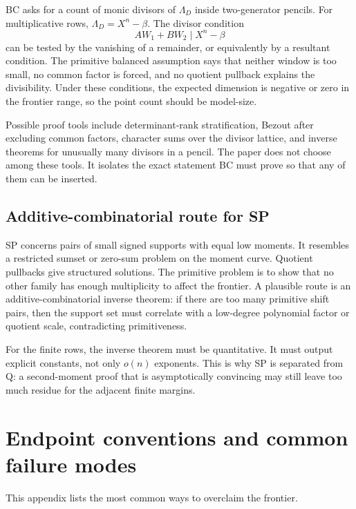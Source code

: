 \documentclass[11pt]{article}
\theoremstyle{definition}
\theoremstyle{remark}
\begin{document}
BC asks for a count of monic divisors of \(\Lambda_D\) inside two-generator pencils.  For multiplicative rows, \(\Lambda_D=X^n-\beta\).  The divisor condition
\[
        AW_1+BW_2\mid X^n-\beta
\]
can be tested by the vanishing of a remainder, or equivalently by a resultant condition.  The primitive balanced assumption says that neither window is too small, no common factor is forced, and no quotient pullback explains the divisibility.  Under these conditions, the expected dimension is negative or zero in the frontier range, so the point count should be model-size.

Possible proof tools include determinant-rank stratification, Bezout after excluding common factors, character sums over the divisor lattice, and inverse theorems for unusually many divisors in a pencil.  The paper does not choose among these tools.  It isolates the exact statement BC must prove so that any of them can be inserted.

\subsection{Additive-combinatorial route for SP}\label{appsub:SP-route}

SP concerns pairs of small signed supports with equal low moments.  It resembles a restricted sumset or zero-sum problem on the moment curve.  Quotient pullbacks give structured solutions.  The primitive problem is to show that no other family has enough multiplicity to affect the frontier.  A plausible route is an additive-combinatorial inverse theorem: if there are too many primitive shift pairs, then the support set must correlate with a low-degree polynomial factor or quotient scale, contradicting primitiveness.

For the finite rows, the inverse theorem must be quantitative.  It must output explicit constants, not only \(o(n)\) exponents.  This is why SP is separated from Q: a second-moment proof that is asymptotically convincing may still leave too much residue for the adjacent finite margins.

\section{Endpoint conventions and common failure modes}\label{app:endpoint-failure-modes}

This appendix lists the most common ways to overclaim the frontier.
\end{document}
